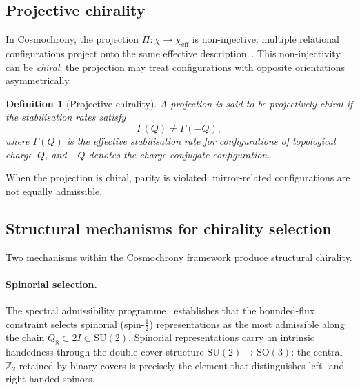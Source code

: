 \documentclass[11pt,a4paper]{article}
\newtheorem{definition}[theorem]{Definition}
\begin{document}
    \subsection{Projective chirality}

      In Cosmochrony, the projection $\Pi: \chi \to \chi_{\mathrm{eff}}$
      is non-injective: multiple relational configurations project onto the
      same effective description~\cite{Cosmochrony}.
      This non-injectivity can be \emph{chiral}: the projection may
      treat configurations with opposite orientations asymmetrically.

      \begin{definition}[Projective chirality]
        \label{def:chirality}
        A projection is said to be projectively chiral if the stabilisation
        rates satisfy
        \begin{equation}
          \label{eq:chiral}
          \Gamma(Q) \neq \Gamma(-Q),
        \end{equation}
        where $\Gamma(Q)$ is the effective stabilisation rate for configurations
        of topological charge~$Q$, and $-Q$ denotes the charge-conjugate
        configuration.
      \end{definition}

      When the projection is chiral, parity is violated:
      mirror-related configurations are not equally admissible.

    \subsection{Structural mechanisms for chirality selection}

      Two mechanisms within the Cosmochrony framework produce structural
      chirality.

      \paragraph{Spinorial selection.}
        The spectral admissibility programme~\cite{Beau2026a1,Beau2026a2}
        establishes that the bounded-flux constraint selects spinorial
        (spin-$\frac{1}{2}$) representations as the most admissible along the
        chain $Q_8 \subset 2I \subset \mathrm{SU}(2)$.
        Spinorial representations carry an intrinsic handedness through the
        double-cover structure $\mathrm{SU}(2) \to \mathrm{SO}(3)$:
        the central $\mathbb{Z}_2$ retained by binary covers is precisely
        the element that distinguishes left- and right-handed spinors.
\end{document}
